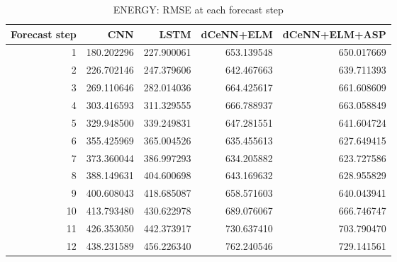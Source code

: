 \begin{table}
\caption{ENERGY: RMSE at each forecast step}
\begin{tabular}{rrrrr}
\toprule
Forecast step & CNN & LSTM & dCeNN+ELM & dCeNN+ELM+ASP \\
\midrule
1 & 180.202296 & 227.900061 & 653.139548 & 650.017669 \\
2 & 226.702146 & 247.379606 & 642.467663 & 639.711393 \\
3 & 269.110646 & 282.014036 & 664.425617 & 661.608609 \\
4 & 303.416593 & 311.329555 & 666.788937 & 663.058849 \\
5 & 329.948500 & 339.249831 & 647.281551 & 641.604724 \\
6 & 355.425969 & 365.004526 & 635.455613 & 627.649415 \\
7 & 373.360044 & 386.997293 & 634.205882 & 623.727586 \\
8 & 388.149631 & 404.600698 & 643.169632 & 628.955829 \\
9 & 400.608043 & 418.685087 & 658.571603 & 640.043941 \\
10 & 413.793480 & 430.622978 & 689.076067 & 666.746747 \\
11 & 426.353050 & 442.373917 & 730.637410 & 703.790470 \\
12 & 438.231589 & 456.226340 & 762.240546 & 729.141561 \\
\bottomrule
\end{tabular}
\end{table}
